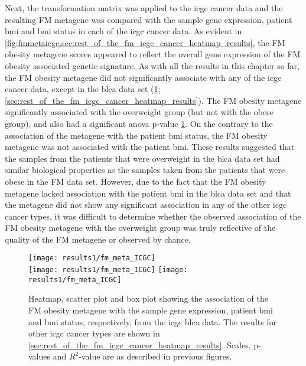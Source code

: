 Next, the transformation matrix was applied to the \gls{icgc} cancer data and the resulting FM metagene was compared with the sample gene expression, patient \gls{bmi} and \gls{bmi} status in each of the \gls{icgc} cancer data.
As evident in \cref{fig:fmmetaicgc,sec:rest_of_the_fm_icgc_cancer_heatmap_results}, the FM obesity metagene scores appeared to reflect the overall gene expression of the FM obesity associated genetic signature.
As with all the results in this chapter so far, the FM obesity metagene did not significantly associate with any of the \gls{icgc} cancer data, except in the \gls{blca} data set (\cref{fig:fmmetaicgc}; \cref{sec:rest_of_the_fm_icgc_cancer_heatmap_results}).
The FM obesity metagene significantly associated with the overweight group (but not with the obese group), and also had a significant \gls{anova} p-value \cref{fig:fmmetaicgc}.
On the contrary to the association of the metagene with the patient \gls{bmi} status, the FM obesity metagene was not associated with the patient \gls{bmi}.
These results suggested that the samples from the patients that were overweight in the \gls{blca} data set had similar biological properties as the samples taken from the patients that were obese in the FM data set.
However, due to the fact that the FM obesity metagene lacked association with the patient \gls{bmi} in the \gls{blca} data set and that the metagene did not show any significant association in any of the other \gls{icgc} cancer types, it was difficult to determine whether the observed association of the FM obesity metagene with the overweight group was truly reflective of the quality of the FM metagene or observed by chance.

\begin{figure}[htp!]
	\centering
	\texttt{[image: results1/fm\_meta\_ICGC]}\\
	\texttt{[image: results1/fm\_meta\_ICGC]}
	\hfill
	\texttt{[image: results1/fm\_meta\_ICGC]}
	\caption[FM obesity metagene in the \acrshort{icgc} \acrshort{blca} data]{Heatmap, scatter plot and box plot showing the association of the FM obesity metagene with the sample gene expression, patient \gls{bmi} and \gls{bmi} status, respectively, from the \acrshort{icgc} \acrshort{blca} data.
	The results for other \gls{icgc} cancer types are shown in \cref{sec:rest_of_the_fm_icgc_cancer_heatmap_results}.
	Scales, p-values and $R^2$-value are as described in previous figures.}
	\label{fig:fmmetaicgc}
\end{figure}

